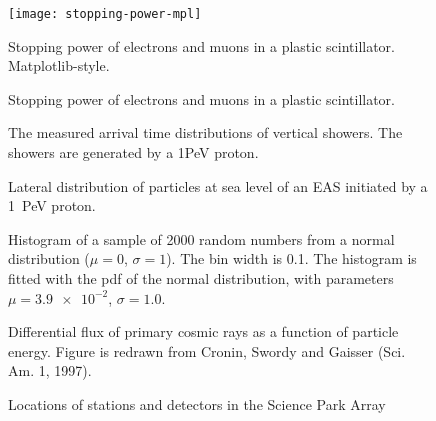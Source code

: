 \documentclass[a4paper,11pt]{article}
\begin{document}
\begin{figure}
\centering
\texttt{[image: stopping-power-mpl]}
\caption{Stopping power of electrons and muons in a plastic scintillator.
Matplotlib-style.}
\end{figure}

\begin{figure}
\centering

\caption{Stopping power of electrons and muons in a plastic scintillator.}
\end{figure}

\begin{figure}
\centering

\caption{The measured arrival time distributions of vertical showers. The
showers are generated by a 1PeV proton.}
\end{figure}

\begin{figure}
\centering

\caption{Lateral distribution of particles at sea level of an EAS
initiated by a \SI{1}{\peta\electronvolt} proton.}
\end{figure}

\begin{figure}
\centering

\caption{Histogram of a sample of \num{2000} random numbers from a normal
distribution ($\mu = 0$, $\sigma = 1$).  The bin width is \num{.1}.  The
histogram is fitted with the pdf of the normal distribution, with
parameters $\mu = \num{3.9e-2}$, $\sigma=\num{1.0}$.}
\end{figure}

\begin{figure}
\centering

\caption{Differential flux of primary cosmic rays as a function of
particle energy.  Figure is redrawn from Cronin, Swordy and Gaisser (Sci.
Am. 1, 1997).}
\end{figure}

\begin{figure}
\centering

\caption{Locations of stations and detectors in the Science Park Array}
\end{figure}
\end{document}
